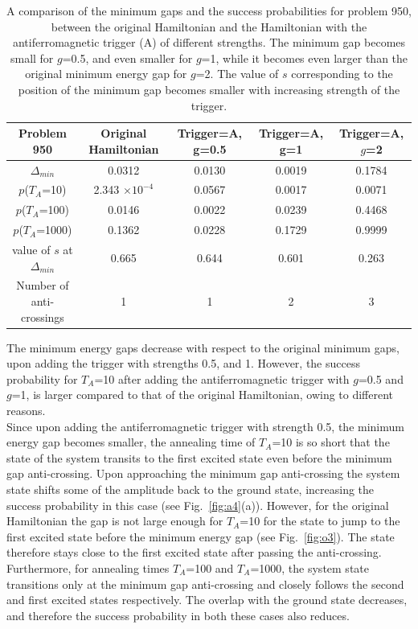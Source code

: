 \documentclass[../main.tex]{subfiles}
\begin{document}
\begin{table}[H]
\centering
\renewcommand{\arraystretch}{1.5}
\begin{tabular}{|c|c|c|c|c|}
\hline 
Problem 950 & Original Hamiltonian & Trigger=A, g=0.5 & Trigger=A, g=1 & Trigger=A, $g$=2 \\ 
\hline 
$\Delta_{min}$ & 0.0312 & 0.0130 & 0.0019 & 0.1784 \\ 
\hline 
$p$($T_A$=10) & 2.343 $\times 10^{-4}$ & 0.0567 & 0.0017 & 0.0071\\ 
\hline 
$p$($T_A$=100) & 0.0146 & 0.0022 & 0.0239 & 0.4468 \\ 
\hline 
$p$($T_A$=1000) & 0.1362 & 0.0228 & 0.1729 & 0.9999 \\ 
\hline 
value of $s$ at $\Delta_{min}$ & 0.665 & 0.644 & 0.601 & 0.263 \\ 
\hline 
Number of anti-crossings & 1 & 1 & 2 & 3 \\
\hline
\end{tabular} 
\caption{A comparison of the minimum gaps and the success probabilities for problem 950, between the original Hamiltonian and the Hamiltonian with the antiferromagnetic trigger (A) of different strengths. The minimum gap becomes small for $g$=0.5, and even smaller for $g$=1, while it becomes even larger than the original minimum energy gap for $g$=2. The value of $s$ corresponding to the position of the minimum gap becomes smaller with increasing strength of the trigger.}
\label{tab:a2}
\end{table}


The minimum energy gaps decrease with respect to the original minimum gaps, upon adding the trigger with strengths 0.5, and 1. However, the success probability for $T_A$=10 after adding the antiferromagnetic trigger with $g$=0.5 and $g$=1, is larger compared to that of the original Hamiltonian, owing to different reasons.\\

Since upon adding the antiferromagnetic trigger with strength 0.5, the minimum energy gap becomes smaller, the annealing time of $T_A$=10 is so short that the state of the system transits to the first excited state even before the minimum gap anti-crossing. Upon approaching the minimum gap anti-crossing the system state shifts some of the amplitude back to the ground state, increasing the success probability in this case (see Fig.~\ref{fig:a4}(a)). However, for the original Hamiltonian the gap is not large enough for $T_A$=10 for the state to jump to the first excited state before the minimum energy gap (see Fig.~\ref{fig:o3}). The state therefore stays close to the first excited state after passing the anti-crossing.\\
Furthermore, for annealing times $T_A$=100 and $T_A$=1000, the system state transitions only at the minimum gap anti-crossing and closely follows the second and first excited states respectively. The overlap with the ground state decreases, and therefore the success probability in both these cases also reduces.\\
\end{document}
